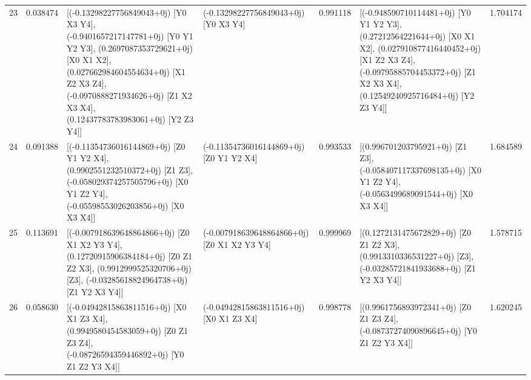 \begin{tabular}{rrllrlr}
      23 &      0.038474 &                                                                                                                        [(-0.13298227756849043+0j) [Y0 X3 Y4], (-0.9401657217147781+0j) [Y0 Y1 Y2 Y3], (0.2697087353729621+0j) [X0 X1 X2], (0.027662984604554634+0j) [X1 Z2 X3 Z4], (-0.0970888271934626+0j) [Z1 X2 X3 X4], (0.12437783783983061+0j) [Y2 Z3 Y4]] &         (-0.13298227756849043+0j) [Y0 X3 Y4] &      0.991118 &                                                                                                                           [(-0.948590710114481+0j) [Y0 Y1 Y2 Y3], (0.27212564221644+0j) [X0 X1 X2], (0.027910877416440452+0j) [X1 Z2 X3 Z4], (-0.09795885704453372+0j) [Z1 X2 X3 X4], (0.12549240925716484+0j) [Y2 Z3 Y4]] &  1.704174 \\
      24 &      0.091388 &                                                                                                                                                                                                      [(-0.11354736016144869+0j) [Z0 Y1 Y2 X4], (0.9902551232510372+0j) [Z1 Z3], (-0.058029374257505796+0j) [X0 Y1 Z2 Y4], (-0.05598553026203856+0j) [X0 X3 X4]] &      (-0.11354736016144869+0j) [Z0 Y1 Y2 X4] &      0.993533 &                                                                                                                                                                                                            [(0.996701203795921+0j) [Z1 Z3], (-0.058407117337698135+0j) [X0 Y1 Z2 Y4], (-0.0563499689091544+0j) [X0 X3 X4]] &  1.684589 \\
      25 &      0.113691 &                                                                                                                                                                                                    [(-0.007918639648864866+0j) [Z0 X1 X2 Y3 Y4], (0.12720915906384184+0j) [Z0 Z1 Z2 X3], (0.9912999525320706+0j) [Z3], (-0.03285618824964738+0j) [Z1 Y2 X3 Y4]] &  (-0.007918639648864866+0j) [Z0 X1 X2 Y3 Y4] &      0.999969 &                                                                                                                                                                                                             [(0.1272131475672829+0j) [Z0 Z1 Z2 X3], (0.9913310336531227+0j) [Z3], (-0.03285721841933688+0j) [Z1 Y2 X3 Y4]] &  1.578715 \\
      26 &      0.058630 &                                                                                                                                                                                                                                    [(-0.04942815863811516+0j) [X0 X1 Z3 X4], (0.9949580454583059+0j) [Z0 Z1 Z3 Z4], (-0.08726594359446892+0j) [Y0 Z1 Z2 Y3 X4]] &      (-0.04942815863811516+0j) [X0 X1 Z3 X4] &      0.998778 &                                                                                                                                                                                                                                        [(0.9961756893972341+0j) [Z0 Z1 Z3 Z4], (-0.08737274090896645+0j) [Y0 Z1 Z2 Y3 X4]] &  1.620245 \\

\end{tabular}

